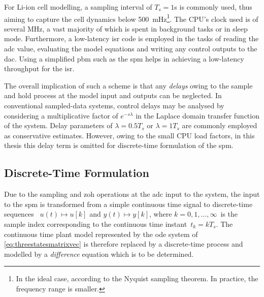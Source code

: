 For  Li-ion  cell  modelling,  a  sampling interval  of  $T_s  =  1$\si{\second}
is   commonly  used,   thus  aiming   to   capture  the   cell  dynamics   below
\SI{500}{\milli\hertz}\footnote{In  the ideal  case,  according  to the  Nyquist
sampling theorem. In practice, the frequency range is smaller.}. The CPU's clock
used is of  several \si{\MHz}, a vast  majority of which is  spent in background
tasks or in sleep mode. Furthermore, a low-latency \gls{isr} code is employed in
the tasks  of reading the  \gls{adc} value,  evaluating the model  equations and
writing any control outputs to the  \gls{dac}. Using a simplified \gls{pbm} such
as the \gls{spm} helps in achieving a low-latency throughput for the \gls{isr}.

The overall implication of such a scheme  is that any \emph{delays} owing to the
sample and  hold process  at the model  input and outputs  can be  neglected. In
conventional sampled-data systems, control delays may be analysed by considering
a multiplicative factor of $e^{-sλ}$ in the Laplace domain transfer function of
the system.  Delay parameters of  $λ = 0.5  T_s$ or $λ  = 1 T_s$  are commonly
employed  as  conservative estimates.  However,  owing  to  the small  CPU  load
factors, in this thesis this delay term is omitted for discrete-time formulation
of the \gls{spm}.

\subsection{Discrete-Time  Formulation}


Due  to the  sampling and  \gls{zoh} operations  at the  \gls{adc} input  to the
system,  the input  to the  \gls{spm} is  transformed from  a simple  continuous
time signal  to discrete-time  sequences \ie~\mbox{$u(t) \mapsto  u[k]$} and
\mbox{$y(t)  \mapsto  y[k]$}, where  \mbox{$k  =  0,1,\dots,∞$}~is the  sample
index  corresponding  to  the   continuous  time  instant~\mbox{$t_k  =  kT_s$}.
The  continuous  time  plant  model  represented  by  the  \gls{ode}  system  of
\cref{eq:threestatesmatrixvec} is therefore replaced  by a discrete-time process
and modelled by a \emph{difference} equation which is to be determined.


